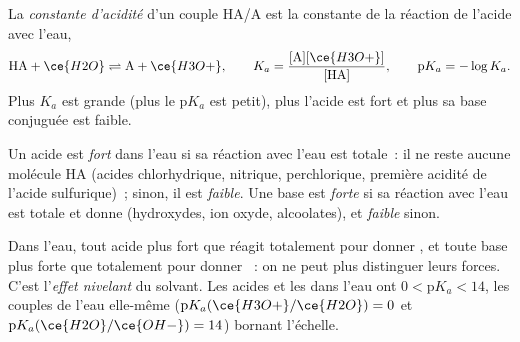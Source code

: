 \begin{definition}\label{def:b1:predominant-reaction:acidity-constant}
La \emph{constante d'acidité} d'un couple HA/A est
la constante de la réaction de l'acide avec l'eau,
\[
  \mathrm{HA} + \ce{H2O} \rightleftharpoons \mathrm{A} + \ce{H3O+}, \qquad
  K_a = \frac{[\mathrm{A}][\ce{H3O+}]}{[\mathrm{HA}]}, \qquad
  \mathrm{p}K_a = -\log K_a .
\]
Plus $K_a$ est grande (plus le $\mathrm{p}K_a$ est petit), plus l'acide
est fort et plus sa base conjuguée est faible.
\end{definition}

\begin{definition}\label{def:b1:predominant-reaction:strong-acid}
Un acide est \emph{fort} dans l'eau si sa réaction avec
l'eau est totale~: il ne reste aucune molécule HA (acides chlorhydrique,
nitrique, perchlorique, première acidité de l'acide sulfurique)~; sinon,
il est \emph{faible}. Une base est \emph{forte}
si sa réaction avec l'eau est totale et donne  (hydroxydes, ion
oxyde, alcoolates), et \emph{faible} sinon.
\end{definition}

\begin{definition}\label{def:b1:predominant-reaction:levelling}
Dans l'eau, tout acide plus fort que  réagit totalement pour
donner , et toute base plus forte que  totalement pour
donner ~: on ne peut plus distinguer leurs forces. C'est
l'\emph{effet nivelant} du solvant. Les acides et
les  dans l'eau ont $0 < \mathrm{p}K_a < 14$, les couples
de l'eau elle-même ($\mathrm{p}K_a(\ce{H3O+}/\ce{H2O}) = 0$ et
$\mathrm{p}K_a(\ce{H2O}/\ce{OH-}) = 14$) bornant l'échelle.
\end{definition}

